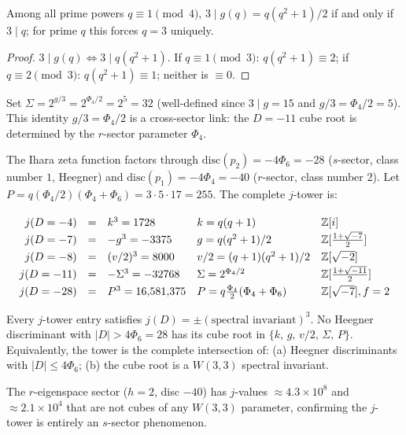 \begin{remark}[C6: divisibility of $g$ by $3$]\label{rem:C6}
Among all prime powers $q\equiv 1\pmod 4$, $3\mid g(q)=q(q^2+1)/2$
if and only if $3\mid q$; for prime $q$ this forces $q=3$ uniquely.
\begin{proof}
$3\mid g(q)\Leftrightarrow 3\mid q(q^2+1)$.
If $q\equiv 1\pmod 3$: $q(q^2+1)\equiv 2$;
if $q\equiv 2\pmod 3$: $q(q^2+1)\equiv 1$; neither is $\equiv 0$.
\end{proof}
Set $\Sigma=2^{g/3}=2^{\Phi_4/2}=2^5=32$ (well-defined since $3\mid g=15$
and $g/3=\Phi_4/2=5$). This identity $g/3=\Phi_4/2$ is a cross-sector link:
the $D=-11$ cube root is determined by the $r$-sector parameter $\Phi_4$.
\end{remark}

The Ihara zeta function factors through
$\mathrm{disc}(p_2)=-4\Phi_6=-28$ ($s$-sector, class number $1$, Heegner) and
$\mathrm{disc}(p_1)=-4\Phi_4=-40$ ($r$-sector, class number $2$).
Let $P=q(\Phi_4/2)(\Phi_4+\Phi_6)=3\cdot 5\cdot 17=255$. The complete $j$-tower is:

\begin{equation}\label{eq:jtower}
\renewcommand{\arraystretch}{1.3}
\begin{array}{rcllll}
  j(D=-4)  &=& k^3 = 1728         &k=q(q+1)         &\mathbb{Z}[i]\\
  j(D=-7)  &=& -g^3 = -3375       &g=q(q^2+1)/2     &\mathbb{Z}[\tfrac{1+\sqrt{-7}}{2}]\\
  j(D=-8)  &=& (v/2)^3 = 8000     &v/2=(q+1)(q^2+1)/2&\mathbb{Z}[\sqrt{-2}]\\
  j(D=-11) &=& -\Sigma^3 = -32768 &\Sigma=2^{\Phi_4/2}&\mathbb{Z}[\tfrac{1+\sqrt{-11}}{2}]\\
  j(D=-28) &=& P^3=16{,}581{,}375 &P=q\tfrac{\Phi_4}{2}(\Phi_4+\Phi_6)&\mathbb{Z}[\sqrt{-7}],f=2
\end{array}
\end{equation}

\begin{proposition}\label{prop:cube}
Every $j$-tower entry satisfies $j(D)=\pm(\text{spectral invariant})^3$.
No Heegner discriminant with $|D|>4\Phi_6=28$ has its cube root
in $\{k,\,g,\,v/2,\,\Sigma,\,P\}$.
Equivalently, the tower is the complete intersection of:
\textnormal{(a)} Heegner discriminants with $|D|\leq 4\Phi_6$;\;
\textnormal{(b)} the cube root is a $W(3,3)$ spectral invariant.
\end{proposition}

\noindent
The $r$-eigenspace sector ($h=2$, disc $-40$) has $j$-values
$\approx 4.3\times 10^8$ and $\approx 2.1\times 10^4$ that are not
cubes of any $W(3,3)$ parameter, confirming the $j$-tower is entirely
an $s$-sector phenomenon.
